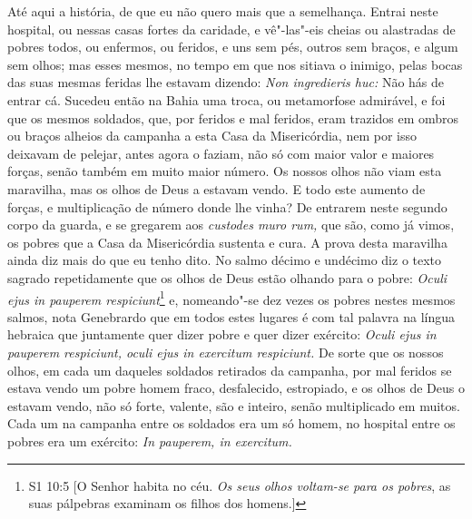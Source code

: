 Até aqui a história, de que eu não quero mais que a semelhança. Entrai
neste hospital, ou nessas casas fortes da caridade, e vê"-las"-eis cheias
ou alastradas de pobres todos, ou enfermos, ou feridos, e uns sem pés,
outros sem braços, e algum sem olhos; mas esses mesmos, no tempo em que
nos sitiava o inimigo, pelas bocas das suas mesmas feridas lhe estavam
dizendo: \emph{Non ingredieris huc:} Não hás de entrar cá. Sucedeu
então na Bahia uma troca, ou metamorfose admirável, e foi que os mesmos
soldados, que, por feridos e mal feridos, eram trazidos em ombros ou
braços alheios da campanha a esta Casa da Misericórdia, nem por isso
deixavam de pelejar, antes agora o faziam, não só com maior valor e
maiores forças, senão também em muito maior número. Os nossos olhos não
viam esta maravilha, mas os olhos de Deus a estavam vendo. E todo este
aumento de forças, e multiplicação de número donde lhe vinha? De
entrarem neste segundo corpo da guarda, e se gregarem aos \emph{custodes
muro rum,} que são, como já vimos, os pobres que a Casa da
Misericórdia sustenta e cura. A prova desta maravilha ainda diz mais do
que eu tenho dito. No salmo décimo e undécimo diz o texto sagrado
repetidamente que os olhos de Deus estão olhando para o pobre:
\emph{Oculi ejus in pauperem respiciunt}\footnote{S1 10:5 [O Senhor habita no céu. \textit{Os seus olhos voltam-se para os pobres}, as suas pálpebras examinam os filhos dos homens.]} e, nomeando"-se dez
vezes os pobres nestes mesmos salmos, nota Genebrardo que em todos estes
lugares é com tal palavra na língua hebraica que juntamente quer dizer
pobre e quer dizer exército: \emph{Oculi ejus in pauperem respiciunt,
oculi ejus in exercitum respiciunt.} De sorte que os nossos olhos, em
cada um daqueles soldados retirados da campanha, por mal feridos se
estava vendo um pobre homem fraco, desfalecido, estropiado, e os olhos
de Deus o estavam vendo, não só forte, valente, são e inteiro, senão
multiplicado em muitos. Cada um na campanha entre os
soldados era um só homem, no hospital entre os pobres era um exército:
\emph{In pauperem, in exercitum.}

